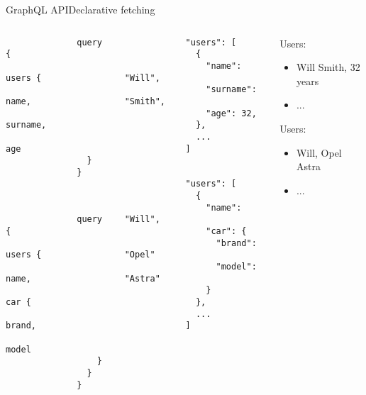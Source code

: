 \documentclass[notes]{beamer}
\begin{document}
  \begin{frame}[fragile]{GraphQL API}{Declarative fetching}
    \begin{columns}
        \begin{column}{0.2\textwidth}
          \scriptsize
          \begin{verbatim}
              query {
                users {
                  name,
                  surname,
                  age
                }
              }



              query {
                users {
                  name,
                  car {
                    brand,
                    model
                  }
                }
              }

          \end{verbatim}
        \end{column}
        \begin{column}{0.35\textwidth}
          \scriptsize
          \begin{verbatim}
            "users": [
              {
                "name": "Will",
                "surname": "Smith",
                "age": 32,
              },
              ...
            ]


            "users": [
              {
                "name": "Will",
                "car": {
                  "brand": "Opel"
                  "model": "Astra"
                }
              },
              ...
            ]
          \end{verbatim}
        \end{column}
        \begin{column}{0.44\textwidth}
          \footnotesize
          Users:
          \begin{itemize}
            \item Will Smith, 32 years
            \item ...
          \end{itemize}
          \vspace{5.5em}
          Users:
          \begin{itemize}
            \item Will, Opel Astra
            \item ...
          \end{itemize}
          \vspace{5em}
        \end{column}
    \end{columns}
  \end{frame}
\end{document}
